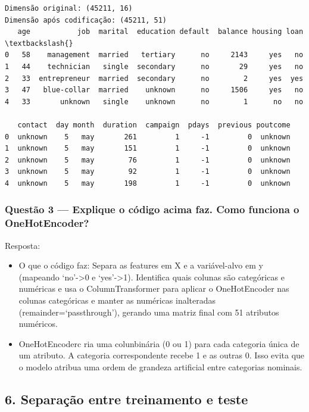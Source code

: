 \documentclass[11pt]{article}
\providecommand{\tightlist}{%
      \setlength{\itemsep}{0pt}\setlength{\parskip}{0pt}}
\begin{document}
    \begin{Verbatim}[commandchars=\\\{\}]
Dimensão original: (45211, 16)
Dimensão após codificação: (45211, 51)
   age           job  marital  education default  balance housing loan  \textbackslash{}
0   58    management  married   tertiary      no     2143     yes   no
1   44    technician   single  secondary      no       29     yes   no
2   33  entrepreneur  married  secondary      no        2     yes  yes
3   47   blue-collar  married    unknown      no     1506     yes   no
4   33       unknown   single    unknown      no        1      no   no

   contact  day month  duration  campaign  pdays  previous poutcome
0  unknown    5   may       261         1     -1         0  unknown
1  unknown    5   may       151         1     -1         0  unknown
2  unknown    5   may        76         1     -1         0  unknown
3  unknown    5   may        92         1     -1         0  unknown
4  unknown    5   may       198         1     -1         0  unknown
    \end{Verbatim}

    \subsubsection{Questão 3 --- Explique o código acima faz. Como funciona
o
OneHotEncoder?}\label{questuxe3o-3-explique-o-cuxf3digo-acima-faz.-como-funciona-o-onehotencoder}

Resposta:

\begin{itemize}
\tightlist
\item
  O que o código faz: Separa as features em X e a variável-alvo em y
  (mapeando `no'-\textgreater0 e `yes'-\textgreater1). Identifica quais
  colunas são categóricas e numéricas e usa o ColumnTransformer para
  aplicar o OneHotEncoder nas colunas categóricas e manter as numéricas
  inalteradas (remainder=`passthrough'), gerando uma matriz final com 51
  atributos numéricos.
\item
  OneHotEncoderc ria uma colunbinária (0 ou 1) para cada categoria única
  de um atributo. A categoria correspondente recebe 1 e as outras 0.
  Isso evita que o modelo atribua uma ordem de grandeza artificial entre
  categorias nominais.
\end{itemize}

    \subsection{6. Separação entre treinamento e
teste}\label{separauxe7uxe3o-entre-treinamento-e-teste}
\end{document}
